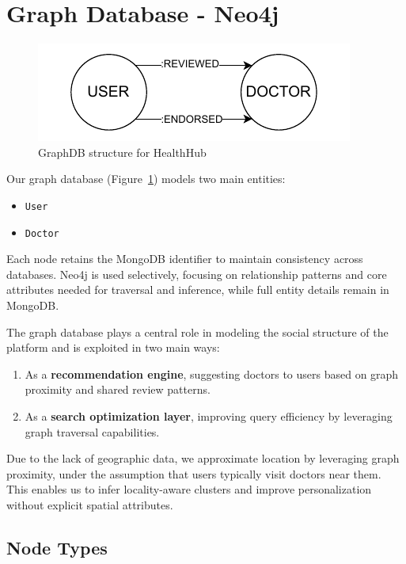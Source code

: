 \section{Graph Database - Neo4j}

\begin{figure}[!h]
    \centering
    \includegraphics[scale=1.7]{./resources/neo4j.pdf}
    \caption{GraphDB structure for HealthHub}
    \label{fig:neo4j-structure}
\end{figure}

Our graph database (Figure~\ref{fig:neo4j-structure}) models two main entities:

\begin{itemize}
  \item \texttt{User}
  \item \texttt{Doctor}
\end{itemize}

Each node retains the MongoDB identifier to maintain consistency across databases. Neo4j is used selectively, focusing on relationship patterns and core attributes needed for traversal and inference, while full entity details remain in MongoDB.

The graph database plays a central role in modeling the social structure of the platform and is exploited in two main ways:
\begin{enumerate}
  \item As a \textbf{recommendation engine}, suggesting doctors to users based on graph proximity and shared review patterns.
  \item As a \textbf{search optimization layer}, improving query efficiency by leveraging graph traversal capabilities.
\end{enumerate}

Due to the lack of geographic data, we approximate location by leveraging graph proximity, under the assumption that users typically visit doctors near them. This enables us to infer locality-aware clusters and improve personalization without explicit spatial attributes.

\subsection{Node Types}

